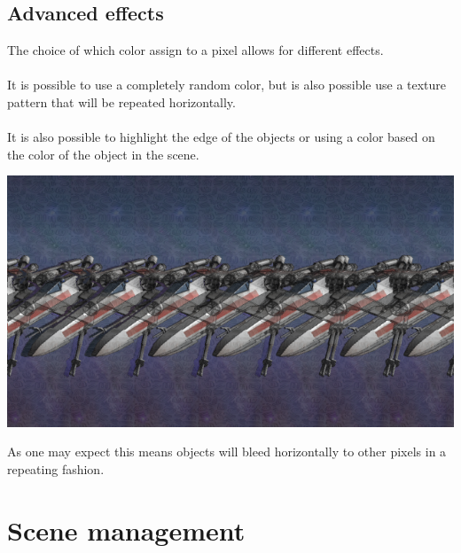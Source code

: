 \documentclass[12pt, a4paper]{article}
\begin{document}
\subsection{Advanced effects}
The choice of which color assign to a pixel allows for different effects.\\\\
It is possible to use a completely random color, but is also possible use a texture pattern that will be repeated horizontally.\\\\
It is also possible to highlight the edge of the objects or using a color based on the color of the object in the scene.
\begin{center}
    \centering
    \includegraphics[width=1.0\textwidth]{img/ship.png}
\end{center}
As one may expect this means objects will bleed horizontally to other pixels in a repeating fashion.
\section{Scene management}
\end{document}
